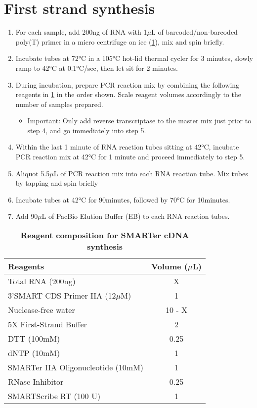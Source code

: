 \section{First strand synthesis}
\label{Isoseq_protocol_cDNAsynthesis}
\begin{enumerate}
	\item For each sample, add 200ng of RNA with 1$\mu$L of barcoded/non-barcoded poly(T) primer in a micro centrifuge on ice (\cref{tab:cdna_synthesis}), mix and spin briefly.
	\item Incubate tubes at 72°C in a 105°C hot-lid thermal cycler for 3 minutes, slowly ramp to 42°C at 0.1°C/sec, then let sit for 2 minutes.
	\item During incubation, prepare PCR reaction mix by combining the following reagents in \cref{tab:cdna_synthesis} in the order shown. Scale reagent volumes accordingly to the number of samples prepared.
	\begin{itemize}
		\item Important: Only add reverse transcriptase to the master mix just prior to step 4, and go immediately into step 5.
	\end{itemize}
	\item Within the last 1 minute of RNA reaction tubes sitting at 42°C, incubate PCR reaction mix at 42°C for 1 minute and proceed immediately to step 5.
	\item Aliquot 5.5$\mu$L of PCR reaction mix into each RNA reaction tube. Mix tubes by tapping and spin briefly 
	\item Incubate tubes at 42°C for 90minutes, followed by 70°C for 10minutes. 
	\item Add 90$\mu$L of PacBio Elution Buffer (EB) to each RNA reaction tubes.
\end{enumerate}

\vspace{1cm}
\begin{table}[h]
	\centering
	\caption[Reagent composition for SMARTer cDNA synthesis]%
	{\textbf{Reagent composition for SMARTer cDNA synthesis}}
	\label{tab:cdna_synthesis}
	\begin{tabularx}{0.8\textwidth}{lc}
		\toprule 
		Reagents                         & Volume ($\mu$L) \\ \midrule
		Total RNA (200ng)         		 & X          \\ 
		3'SMART CDS Primer IIA (12$\mu$M)   & 1           \\ 
		Nuclease-free water              & 10 - X          \\ 
		5X First-Strand Buffer			 & 2       \\ 
		DTT (100mM)						 & 0.25       \\ 
		dNTP (10mM)						 & 1       \\ 
		SMARTer IIA Oligonucleotide (10mM) & 1       \\ 
		RNase Inhibitor					 & 0.25       \\ 
		SMARTScribe RT (100 U)	      	 & 1       \\ 
		\bottomrule	
	\end{tabularx}
\end{table}

